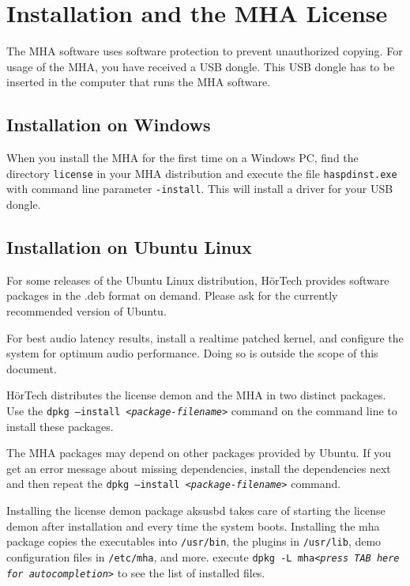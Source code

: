\section{Installation and the MHA License}\label{sec:license}

The MHA software uses software protection to prevent unauthorized copying.
For usage of the MHA, you have received a USB dongle. This USB dongle has to
be inserted in the computer that runs the MHA software.

\subsection{Installation on Windows}

When you install the MHA for the first time on a Windows PC, 
find the directory \texttt{license} in your MHA distribution 
and execute the file \texttt{haspdinst.exe} 
with command line parameter \texttt{-install}.
This will install a driver for your USB dongle.

\subsection{Installation on Ubuntu Linux}

For some releases of the Ubuntu Linux distribution, H\"orTech provides software packages in the .deb format on demand. Please ask for the currently recommended version of Ubuntu.

For best audio latency results, install a realtime patched kernel, and configure the system for optimum audio performance. Doing so is outside the scope of this document.

H\"orTech distributes the license demon and the MHA in two distinct packages.
Use the \texttt{dpkg ---install \textit{<package-filename>}} command on the command line to install these packages.

The MHA packages may depend on other packages provided by Ubuntu.
If you get an error message about missing dependencies, install the dependencies next and then repeat the \texttt{dpkg ---install \textit{<package-filename>}} command.

Installing the license demon package aksusbd takes care of starting the license
demon after installation and every time the system boots. Installing the mha
package copies the executables into \texttt{/usr/bin}, the plugins in \texttt{/usr/lib}, demo configuration files in \texttt{/etc/mha}, and more. execute \texttt{dpkg -L mha\textit{<press TAB here for autocompletion>}}
to see the list of installed files.


